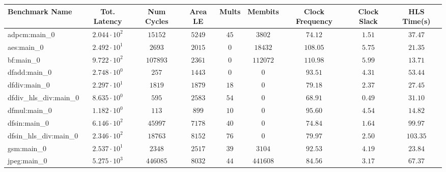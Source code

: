 \begin{tabular}{|l|c|c|c|c|c|c|c|c|}
\hline
Benchmark Name          & Tot. Latency           & Num Cycles & Area LE   & Mults   & Membits    & Clock Frequency & Clock Slack & HLS Time(s) \\
\hline
adpcm:main\_0           & $ 2.044 \cdot 10^{2} $ & $ 15152  $ & $ 5249  $ & $ 45  $ & $ 3802   $ & $ 74.12       $ & $ 1.51    $ & $ 37.47   $ \\
aes:main\_0             & $ 2.492 \cdot 10^{1} $ & $ 2693   $ & $ 2015  $ & $ 0   $ & $ 18432  $ & $ 108.05      $ & $ 5.75    $ & $ 21.35   $ \\
bf:main\_0              & $ 9.722 \cdot 10^{2} $ & $ 107893 $ & $ 2361  $ & $ 0   $ & $ 112072 $ & $ 110.98      $ & $ 5.99    $ & $ 13.71   $ \\
dfadd:main\_0           & $ 2.748 \cdot 10^{0} $ & $ 257    $ & $ 1443  $ & $ 0   $ & $ 0      $ & $ 93.51       $ & $ 4.31    $ & $ 53.44   $ \\
dfdiv:main\_0           & $ 2.297 \cdot 10^{1} $ & $ 1819   $ & $ 1879  $ & $ 18  $ & $ 0      $ & $ 79.18       $ & $ 2.37    $ & $ 27.45   $ \\
dfdiv\_hls\_div:main\_0 & $ 8.635 \cdot 10^{0} $ & $ 595    $ & $ 2583  $ & $ 54  $ & $ 0      $ & $ 68.91       $ & $ 0.49    $ & $ 31.10   $ \\
dfmul:main\_0           & $ 1.182 \cdot 10^{0} $ & $ 113    $ & $ 899   $ & $ 10  $ & $ 0      $ & $ 95.60       $ & $ 4.54    $ & $ 14.82   $ \\
dfsin:main\_0           & $ 6.146 \cdot 10^{2} $ & $ 45997  $ & $ 7178  $ & $ 40  $ & $ 0      $ & $ 74.84       $ & $ 1.64    $ & $ 99.97   $ \\
dfsin\_hls\_div:main\_0 & $ 2.346 \cdot 10^{2} $ & $ 18763  $ & $ 8152  $ & $ 76  $ & $ 0      $ & $ 79.97       $ & $ 2.50    $ & $ 103.35  $ \\
gsm:main\_0             & $ 2.537 \cdot 10^{1} $ & $ 2348   $ & $ 2517  $ & $ 39  $ & $ 3104   $ & $ 92.53       $ & $ 4.19    $ & $ 23.84   $ \\
jpeg:main\_0            & $ 5.275 \cdot 10^{3} $ & $ 446085 $ & $ 8032  $ & $ 44  $ & $ 441608 $ & $ 84.56       $ & $ 3.17    $ & $ 67.37   $ \\

\end{tabular}
